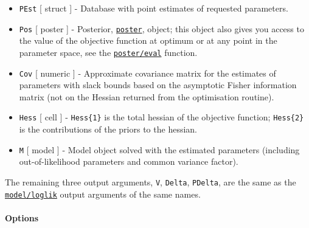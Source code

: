 \begin{itemize}
\item
  \texttt{PEst} {[} struct {]} - Database with point estimates of
  requested parameters.
\item
  \texttt{Pos} {[} poster {]} - Posterior,
  \href{poster/Contents}{\texttt{poster}}, object; this object also
  gives you access to the value of the objective function at optimum or
  at any point in the parameter space, see the
  \href{poster/eval}{\texttt{poster/eval}} function.
\item
  \texttt{Cov} {[} numeric {]} - Approximate covariance matrix for the
  estimates of parameters with slack bounds based on the asymptotic
  Fisher information matrix (not on the Hessian returned from the
  optimisation routine).
\item
  \texttt{Hess} {[} cell {]} - \texttt{Hess\{1\}} is the total hessian
  of the objective function; \texttt{Hess\{2\}} is the contributions of
  the priors to the hessian.
\item
  \texttt{M} {[} model {]} - Model object solved with the estimated
  parameters (including out-of-likelihood parameters and common variance
  factor).
\end{itemize}

The remaining three output arguments, \texttt{V}, \texttt{Delta},
\texttt{PDelta}, are the same as the
\href{model/loglik}{\texttt{model/loglik}} output arguments of the same
names.

\paragraph{Options}\label{options}

